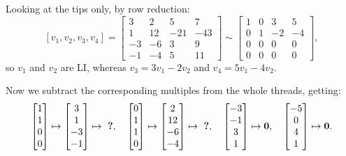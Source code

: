 \documentclass[12pt]{article}
\newcommand{\1}{\mathbf{1}}
\newcommand{\0}{\mathbf{0}}
\theoremstyle{definition}
\begin{document}
Looking at the tips only, by row reduction:
\[
[v_1, v_2, v_3, v_4] =
\left[\begin{matrix}3 & 2 & 5 & 7\\1 & 12 & -21 & -43\\-3 & -6 & 3 & 9\\-1 & -4 & 5 & 11\end{matrix}\right]
\sim
\left[\begin{matrix}1 & 0 & 3 & 5\\0 & 1 & -2 & -4\\0 & 0 & 0 & 0\\0 & 0 & 0 & 0\end{matrix}\right]
,
\]
so $v_1$ and $v_2$ are LI, whereas $v_3 = 3v_1 - 2v_2$ and $v_4=5v_1 - 4v_2$.

Now we subtract the corresponding multiples from the whole threads, getting:
\[
\left[\begin{matrix}1 \\ 1 \\ 0 \\ 0\end{matrix}\right]
\mapsto
\left[\begin{matrix}3 \\ 1 \\ -3 \\ -1\end{matrix}\right]
\mapsto
\text{ \bf ?}
,\ \ \
\left[\begin{matrix}0 \\ 1 \\ 1 \\ 0\end{matrix}\right]
\mapsto
\left[\begin{matrix}2 \\ 12 \\ -6 \\ -4\end{matrix}\right]
\mapsto
\text{ \bf ?}
,\ \ \
\left[\begin{matrix}-3\\-1\\3\\1\end{matrix}\right]
\mapsto
\0
,\ \ \
\left[\begin{matrix}-5\\0\\4\\1\end{matrix}\right]
\mapsto
\0
.
\]
\end{document}
